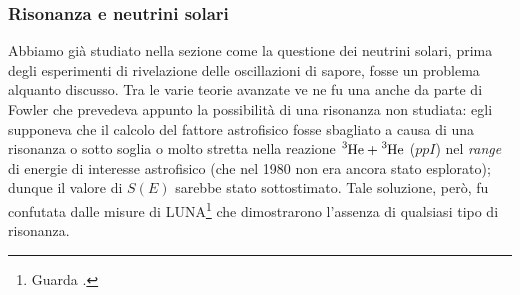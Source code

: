 \subsubsection{Risonanza e neutrini solari}\label{0325-sec-risnu}
Abbiamo già studiato nella sezione  come la questione dei neutrini solari, prima degli esperimenti di rivelazione delle oscillazioni di sapore, fosse un problema alquanto discusso. Tra le varie teorie avanzate ve ne fu una anche da parte di Fowler che prevedeva appunto la possibilità di una risonanza non studiata: egli supponeva che il calcolo del fattore astrofisico fosse sbagliato a causa di una risonanza o sotto soglia o molto stretta nella reazione $\ce{^3He}+\ce{^3He}$ ($ppI$) nel \textit{range} di energie di interesse astrofisico (che nel 1980 non era ancora stato esplorato); dunque il valore di $S(E)$ sarebbe stato sottostimato. Tale soluzione, però, fu confutata dalle misure di LUNA\footnote{Guarda .} che dimostrarono l'assenza di qualsiasi tipo di risonanza.